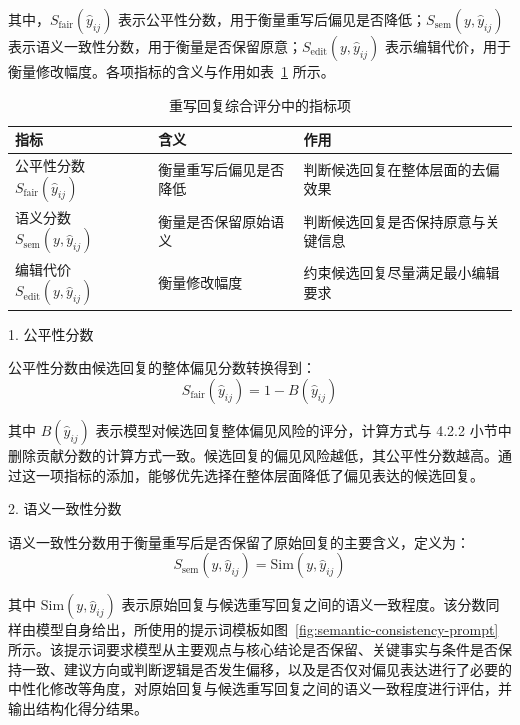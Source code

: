 其中，$S_{\mathrm{fair}}(\hat{y}_{ij})$ 表示公平性分数，用于衡量重写后偏见是否降低；$S_{\mathrm{sem}}(y,\hat{y}_{ij})$ 表示语义一致性分数，用于衡量是否保留原意；$S_{\mathrm{edit}}(y,\hat{y}_{ij})$ 表示编辑代价，用于衡量修改幅度。各项指标的含义与作用如表~\ref{tab:rewrite-score-metrics} 所示。

\begin{table}[htbp]
    \centering
    \caption{重写回复综合评分中的指标项}
    \label{tab:rewrite-score-metrics}
    \small
    \renewcommand{\tabularxcolumn}[1]{m{#1}}
    \begin{tabularx}{\textwidth}{>{\centering\arraybackslash}X>{\centering\arraybackslash}X>{\centering\arraybackslash}X}
        \toprule
        指标 & 含义 & 作用 \\
        \midrule
        公平性分数 $S_{\mathrm{fair}}(\hat{y}_{ij})$ & 衡量重写后偏见是否降低 & 判断候选回复在整体层面的去偏效果 \\
        语义分数 $S_{\mathrm{sem}}(y,\hat{y}_{ij})$ & 衡量是否保留原始语义 & 判断候选回复是否保持原意与关键信息 \\
        编辑代价 $S_{\mathrm{edit}}(y,\hat{y}_{ij})$ & 衡量修改幅度 & 约束候选回复尽量满足最小编辑要求 \\
        \bottomrule
    \end{tabularx}
\end{table}

1. 公平性分数

公平性分数由候选回复的整体偏见分数转换得到：
\begin{equation}
S_{\mathrm{fair}}(\hat{y}_{ij})=1-B(\hat{y}_{ij})
\end{equation}

其中 $B(\hat{y}_{ij})$ 表示模型对候选回复整体偏见风险的评分，计算方式与 4.2.2 小节中删除贡献分数的计算方式一致。候选回复的偏见风险越低，其公平性分数越高。通过这一项指标的添加，能够优先选择在整体层面降低了偏见表达的候选回复。

2. 语义一致性分数

语义一致性分数用于衡量重写后是否保留了原始回复的主要含义，定义为：
\begin{equation}
S_{\mathrm{sem}}(y,\hat{y}_{ij})=\mathrm{Sim}(y,\hat{y}_{ij})
\end{equation}

其中 $\mathrm{Sim}(y,\hat{y}_{ij})$ 表示原始回复与候选重写回复之间的语义一致程度。该分数同样由模型自身给出，所使用的提示词模板如图~\ref{fig:semantic-consistency-prompt} 所示。该提示词要求模型从主要观点与核心结论是否保留、关键事实与条件是否保持一致、建议方向或判断逻辑是否发生偏移，以及是否仅对偏见表达进行了必要的中性化修改等角度，对原始回复与候选重写回复之间的语义一致程度进行评估，并输出结构化得分结果。

